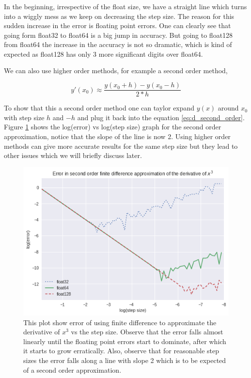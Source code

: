 In the beginning, irrespective of the float size, we have a straight line which turns into a wiggly mess as we keep on decreasing the step size. The reason for this sudden increase in the error is floating point errors. One can clearly see that going form float32 to float64 is a big jump in accuracy. But going to float128 from float64 the increase in the accuracy is not so dramatic, which is kind of expected as float128 has only 3 more significant digits over float64.

We can also use higher order methods, for example a second order method,

\begin{equation}
    y'(x_0)  \approx \frac{y(x_0 + h) - y(x_0 - h)}{2*h}
\end{equation}\label{eq:d_second_order}

To show that this a second order method one can taylor expand $y(x)$ around $x_0$ with step size $h$ and $-h$ and plug it back into the equation \ref{eq:d_second_order}. Figure \ref{fig:x^3_error_order2} shows the log(error) vs log(step size) graph for the second order approximation, notice that the slope of the line is now 2. Using higher order methods can give more accurate results for the same step size but they lead to other issues which we will briefly discuss later.

\begin{figure}[hbt!]
    \centering
    \includegraphics[width=\textwidth]{images/x^3_error_order2.png}
    \caption{This plot show error of using finite difference to approximate the derivative of $x^3$ vs the step size. Observe that the error falls almost linearly until the floating point errors start to dominate, after which it starts to grow erratically. Also, observe that for reasonable step sizes the error falls along a line with slope 2 which is to be expected of a second order approximation. }\label{fig:x^3_error_order2}
\end{figure}


